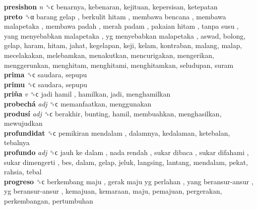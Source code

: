 \textbf{presishon} \emph{n}  ␝ϲ  benarnya, kebenaran, kejituan, kepersisan, ketepatan  \\
\textbf{preto} ␝α   barang gelap ,  berkulit hitam ,  membawa bencana ,  membawa malapetaka ,  membawa padah ,  merah padam ,  pakaian hitam ,  tanpa susu ,  yang menyebabkan malapetaka ,  yg menyebabkan malapetaka , aswad, bolong, gelap, haram, hitam, jahat, kegelapan, keji, kelam, kontraban, malang, malap, mecelakakan, melebamkan, menakutkan, mencurigakan, mengerikan, menggerunkan, menghitam, menghitami, menghitamkan, seludupan, suram  \\
\textbf{prima} ␝ϲ  saudara, sepupu  \\
\textbf{primu} ␝ϲ  saudara, sepupu  \\
\textbf{priña} \emph{v}  ␝ϲ   jadi hamil , hamilkan, jadi, menghamilkan  \\
\textbf{probechá} \emph{adj}  ␝ϲ  memanfaatkan, menggunakan  \\
\textbf{produsí} \emph{adj}  ␝ϲ  berakhir, bunting, hamil, membuahkan, menghasilkan, mewujudkan  \\
\textbf{profundidat} ␝ϲ   pemikiran mendalam , dalamnya, kedalaman, ketebalan, tebalnya  \\
\textbf{profundo} \emph{adj}  ␝ϲ   jauh ke dalam ,  nada rendah ,  sukar dibaca ,  sukar difahami ,  sukar dimengerti , bes, dalam, gelap, jeluk, langsing, lantang, mendalam, pekat, rahsia, tebal  \\
\textbf{progreso} ␝ϲ   berkembang maju ,  gerak maju yg perlahan ,  yang beransur-ansur ,  yg beransur-ansur , kemajuan, kemaraan, maju, pemajuan, pergerakan, perkembangan, pertumbuhan  \\
